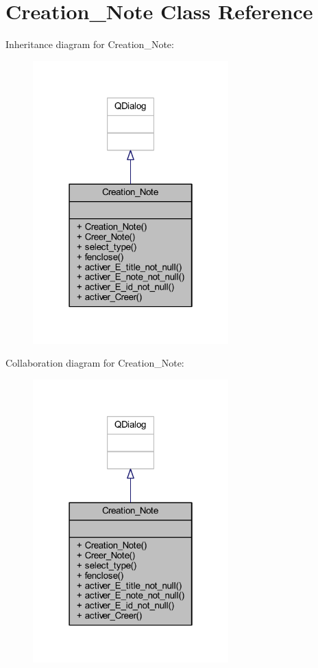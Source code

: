 \hypertarget{class_creation___note}{}\section{Creation\+\_\+\+Note Class Reference}
\label{class_creation___note}


Inheritance diagram for Creation\+\_\+\+Note\+:\nopagebreak
\begin{figure}[H]
\begin{center}
\leavevmode
\includegraphics[width=214pt]{class_creation___note__inherit__graph}
\end{center}
\end{figure}


Collaboration diagram for Creation\+\_\+\+Note\+:\nopagebreak
\begin{figure}[H]
\begin{center}
\leavevmode
\includegraphics[width=214pt]{class_creation___note__coll__graph}
\end{center}
\end{figure}
